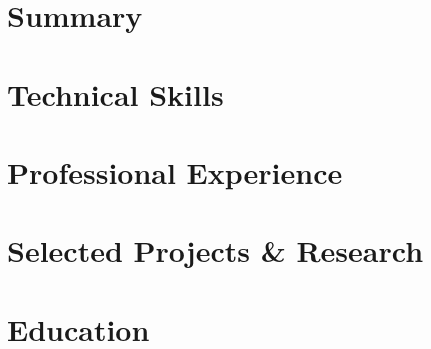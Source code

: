 
\cvheader

\section{Summary}


\section{Technical Skills}


\section{Professional Experience}
\begin{resumeSubHeadingList}

\end{resumeSubHeadingList}

\section{Selected Projects \& Research}
\begin{resumeSubHeadingList}

\end{resumeSubHeadingList}

\section{Education}
\begin{resumeSubHeadingList}

\end{resumeSubHeadingList}


